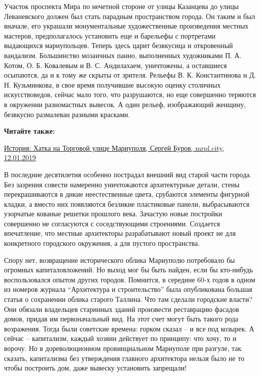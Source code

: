 Участок проспекта Мира по нечетной стороне от улицы Казанцева до улицы
Леваневского должен был стать парадным пространством города. Он таким и был
вначале, его украшали монументальные художественные произведения местных
мастеров, предполагалось установить еще и барельефы с портретами выдающихся
мариупольцев. Теперь здесь царит безвкусица и откровенный вандализм.
Большинство мозаичных панно, выполненных художниками П. А. Котом, О. Б.
Ковалевым и В. С. Андилахаем, уничтожены, а оставшиеся осыпаются, да и к тому
же скрыты от зрителя. Рельефы В. К. Константинова и Д. Н. Кузьминкова, в свое
время получившие высокую оценку столичных искусствоведов, сейчас мало того, что
разрушаются, но еще совершенно теряются в окружении разномастных вывесок. А
один рельеф, изображающий женщину, безвкусно размалеван разными красками.

\begin{minipage}{\textwidth}
\textbf{Читайте также:} 

\href{https://archive.org/details/12_01_2019.sergij_burov.mrpl_city.istoria_hatka_na_torgovoj_ulice_mariupolja}{%
История: Хатка на Торговой улице Мариуполя, Сергей Буров, mrpl.city, 12.01.2019}
\end{minipage}

В последние десятилетия особенно пострадал внешний вид старой части города.
Без зазрения совести намеренно уничтожаются архитектурные детали, стены
перекрашиваются в дикие неестественные цвета, срубаются элементы фигурной
кладки, а вместо них появляются безликие пластиковые панели, выбрасываются
узорчатые кованые решетки прошлого века. Зачастую новые постройки совершенно
не согласуются с соседствующими строениями. Создается впечатление, что местные
архитекторы разрабатывают новый проект не для конкретного городского
окружения, а для пустого пространства.

Спору нет, возвращение исторического облика Мариуполю потребовало бы огромных
капиталовложений. Но выход мог бы быть найден, если бы кто-нибудь
воспользовался опытом других городов. Помнится, в середине 60-х годов в одном
из номеров журнала \enquote{Архитектура и строительство} была опубликована большая
статья о сохранении облика старого Таллина. Что там сделали городские власти?
Они обязали владельцев старинных зданий произвести реставрацию фасадов домов,
придав им первоначальный вид. На этот счет могут быть такого рода возражения.
Тогда были советские времена: горком сказал – и все под козырек. А сейчас –
капитализм, каждый хозяин действует по принципу: что хочу, то и ворочу. Но в
дореволюционном провинциальном Мариуполе при разгуле, так сказать, капитализма
без утверждения главного архитектора нельзя было не то чтобы построить дом,
даже вывеску установить запрещали!

